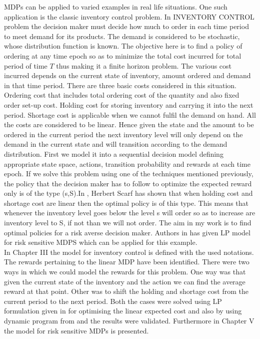 \documentclass[11pt,a4paper,oneside]{report}
\begin{document}
\noindent MDPs can be applied to varied examples in real life situations. One such application is the classic inventory control problem. In INVENTORY CONTROL problem the decision maker must decide how much to order in each time period to meet demand for its products. The demand  is considered to be stochastic, whose distribution function is known. The objective here is to find a policy of ordering at any time epoch so as to minimize the total cost incurred for total period of time $T$ thus making it a finite horizon problem. The various cost incurred depends on the current state of inventory, amount ordered and demand in that time period. There are three basic costs considered in this situation. Ordering cost that includes total  ordering cost of the quantity and also fixed order set-up cost. Holding cost for storing inventory and carrying it into the next period. Shortage cost is applicable when we cannot fulfil the demand on hand. All the costs are considered to be linear. Hence given the state and the amount to be ordered in the current period the next inventory level will only depend on the demand in the current state and will transition according to the demand distribution.  First we model it into a sequential decision model defining appropriate state space, actions, transition probability and rewards at each time epoch.  If we solve this problem using one of the techniques mentioned previously, the policy that the decision maker has to follow to optimize the expected reward only  is of the type (s,S).In \cite{scarf1959optimality}, Herbert Scarf has shown that when holding cost and shortage cost are linear then the optimal policy is of this type. This means that whenever the inventory level goes below the level s will order so as to increase are inventory level to S, if not than we will not order.  The aim in my work is to find optimal policies for a risk averse decision maker. Authors in \citep{kumar2015finite} has given LP model for risk sensitive MDPS which can be applied for this example. \\

In Chapter III the model for inventory control is defined with the used notations. The rewards pertaining to the linear MDP have been identified. There were two ways in which we could model the rewards for this problem. One way was that given the current state of the inventory and the action we can find the average reward at that point. Other was to shift the holding and shortage cost from the current period to the next period. Both the cases were solved using LP formulation given in \citep{kumar2015finite} for optimising the linear expected cost and also by using dynamic program from \citep{puterman1990market} and the results were validated. Furthermore in Chapter V the model for risk sensitive MDPs is presented.
\end{document}
